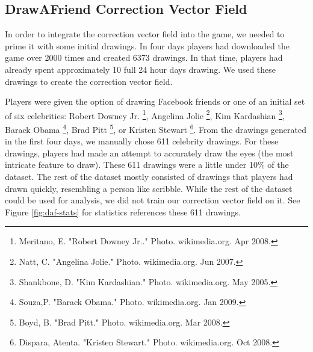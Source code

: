 \subsection{DrawAFriend Correction Vector Field}
In order to integrate the correction vector field into the game, we needed to prime it with some initial drawings. In four days players had downloaded the game over 2000 times and created 6373 drawings. In that time, players had already spent approximately 10 full 24 hour days drawing. We used these drawings to create the correction vector field.


Players were given the option of drawing Facebook friends or one of an initial set of six celebrities: Robert Downey Jr. \footnote{Meritano, E. "Robert Downey Jr.." Photo. wikimedia.org. Apr 2008.}, Angelina Jolie \footnote{Natt, C. "Angelina Jolie." Photo. wikimedia.org. Jun 2007.}, Kim Kardashian \footnote{Shankbone, D. "Kim Kardashian." Photo. wikimedia.org. May 2005.}, Barack Obama \footnote{Souza,P. "Barack Obama." Photo. wikimedia.org. Jan 2009.}, Brad Pitt \footnote{Boyd, B. "Brad Pitt." Photo. wikimedia.org. Mar 2008.}, or Kristen Stewart \footnote{Dispara, Atenta. "Kristen Stewart." Photo. wikimedia.org. Oct 2008.}. From the drawings generated in the first four days, we manually chose 611 celebrity drawings. For these drawings, players had made an attempt to accurately draw the eyes (the most intricate feature to draw). These 611 drawings were a little under 10\% of the dataset. The rest of the dataset mostly consisted of drawings that players had drawn quickly, resembling a person like scribble. While the rest of the dataset could be used for analysis, we did not train our correction vector field on it.  See Figure \ref{fig:daf-stats}  for statistics references these 611 drawings.

